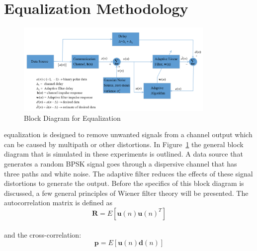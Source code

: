 \documentclass[journal]{IEEEtran}
\begin{document}


\section{Equalization Methodology}
\begin{figure}
  \centering
  \captionsetup{justification=centering,font = small}
  \includegraphics[width=0.85\textwidth] {Plots/BlockDiagram}
  \caption{Block Diagram for Equalization \cite{lecturenotes}}
    \label{fig:BLOCK}
\end{figure}
 equalization is designed to remove unwanted signals from
a channel output which can be caused by multipath or other distortions. In Figure~\ref{fig:BLOCK} the
general block diagram that is simulated in these experiments is outlined. A data source that
generates a random BPSK signal goes through a dispersive channel that has three paths and white noise.
The adaptive filter reduces the effects of these signal distortions to generate the output.
Before the specifics of this block diagram is discussed, a few general principles of
Wiener filter theory will be presented. The autocorrelation matrix is defined as
$$\boldsymbol{R} = E[\boldsymbol{u}(n)\boldsymbol{u}(n)^T] $$
\\
and the cross-correlation:
$$\boldsymbol{p} = E[\boldsymbol{u}(n)\boldsymbol{d}(n)]$$
\end{document}
